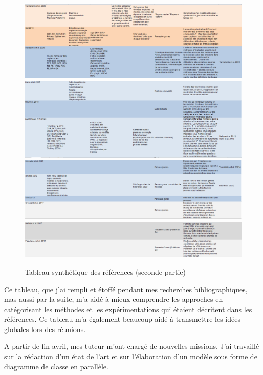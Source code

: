 \documentclass{article}
\begin{document}
		\begin{figure}
			\includegraphics[scale=0.47]{include/tri5.PNG}
			\includegraphics[scale=0.47]{include/tri6.PNG}
			\includegraphics[scale=0.47]{include/tri7.PNG}
			\includegraphics[scale=0.47]{include/tri8.PNG}
			\caption{Tableau synthétique des références (seconde partie)}
			\label{fig:tabsynt2}
		\end{figure}
		Ce tableau, que j'ai rempli et étoffé pendant mes recherches bibliographiques, mas aussi par la suite, m'a aidé à mieux comprendre les approches en catégorisant les méthodes et les expérimentations qui étaient décritent dans les références. 
		Ce tableau m'a également beaucoup aidé à transmettre les idées globales lors des réunions.\par
		A partir de fin avril, mes tuteur m'ont chargé de nouvelles missions. J'ai travaillé sur la rédaction d'un état de l'art et sur l'élaboration d'un modèle sous forme de diagramme de classe en parallèle.
\end{document}
